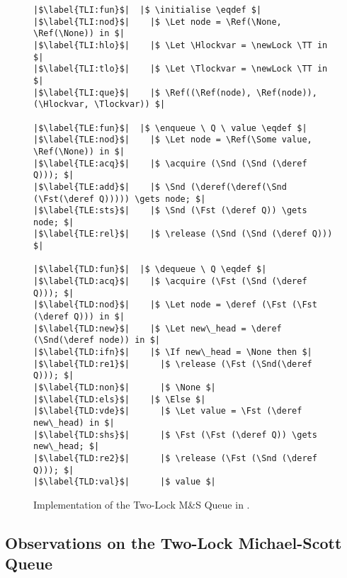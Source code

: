 \documentclass[a4paper, 10pt]{report}
\theoremstyle{definition}
\newcommand{\newLock}{\operatorname{newLock}}
\newcommand{\acquire}{\operatorname{acquire}}
\newcommand{\release}{\operatorname{release}}
\newcommand{\initialise}{\operatorname{initialize}}
\newcommand{\enqueue}{\operatorname{enqueue}}
\newcommand{\dequeue}{\operatorname{dequeue}}
\newcommand{\msq}{M\&S Queue}
\newcommand{\tlmsq}{Two-Lock \msq{}}
\newcommand{\Hlockvar}{H\_lock}
\newcommand{\Tlockvar}{T\_lock}
\begin{document}
\begin{figure}
\begin{verbatim}
|$\label{TLI:fun}$|  |$ \initialise \eqdef $|
|$\label{TLI:nod}$|    |$ \Let node = \Ref(\None, \Ref(\None)) in $|
|$\label{TLI:hlo}$|    |$ \Let \Hlockvar = \newLock \TT in $|
|$\label{TLI:tlo}$|    |$ \Let \Tlockvar = \newLock \TT in $|
|$\label{TLI:que}$|    |$ \Ref((\Ref(node), \Ref(node)), (\Hlockvar, \Tlockvar)) $|

|$\label{TLE:fun}$|  |$ \enqueue \ Q \ value \eqdef $|
|$\label{TLE:nod}$|    |$ \Let node = \Ref(\Some value, \Ref(\None)) in $|
|$\label{TLE:acq}$|    |$ \acquire (\Snd (\Snd (\deref Q))); $|
|$\label{TLE:add}$|    |$ \Snd (\deref(\deref(\Snd (\Fst(\deref Q))))) \gets node; $|
|$\label{TLE:sts}$|    |$ \Snd (\Fst (\deref Q)) \gets node; $|
|$\label{TLE:rel}$|    |$ \release (\Snd (\Snd (\deref Q))) $|

|$\label{TLD:fun}$|  |$ \dequeue \ Q \eqdef $|
|$\label{TLD:acq}$|    |$ \acquire (\Fst (\Snd (\deref Q))); $|
|$\label{TLD:nod}$|    |$ \Let node = \deref (\Fst (\Fst (\deref Q))) in $|
|$\label{TLD:new}$|    |$ \Let new\_head = \deref (\Snd(\deref node)) in $|
|$\label{TLD:ifn}$|    |$ \If new\_head = \None then $|
|$\label{TLD:re1}$|      |$ \release (\Fst (\Snd(\deref Q))); $|
|$\label{TLD:non}$|      |$ \None $|
|$\label{TLD:els}$|    |$ \Else $|
|$\label{TLD:vde}$|      |$ \Let value = \Fst (\deref new\_head) in $|
|$\label{TLD:shs}$|      |$ \Fst (\Fst (\deref Q)) \gets new\_head; $|
|$\label{TLD:re2}$|      |$ \release (\Fst (\Snd (\deref Q))); $|
|$\label{TLD:val}$|      |$ value $|
\end{verbatim}
\caption{Implementation of the \tlmsq{} in \heaplang.}
\label{TLMSQ:impl:code}
\end{figure}

\subsection{Observations on the Two-Lock Michael-Scott Queue}
\label{TLMSQ:implementation:sub:observations}
\end{document}
